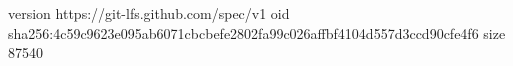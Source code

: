 version https://git-lfs.github.com/spec/v1
oid sha256:4c59c9623e095ab6071cbcbefe2802fa99c026affbf4104d557d3ccd90cfe4f6
size 87540

